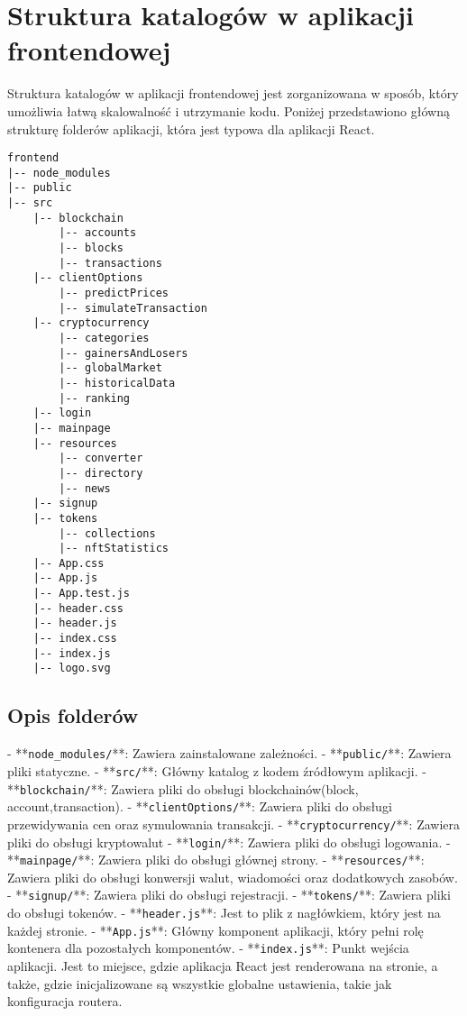 \section{Struktura katalogów w aplikacji frontendowej}

Struktura katalogów w aplikacji frontendowej jest zorganizowana w sposób, który umożliwia łatwą skalowalność i utrzymanie kodu. Poniżej przedstawiono główną strukturę folderów aplikacji, która jest typowa dla aplikacji React.
\begin{verbatim}
frontend
|-- node_modules
|-- public
|-- src
    |-- blockchain
        |-- accounts
        |-- blocks
        |-- transactions
    |-- clientOptions
        |-- predictPrices
        |-- simulateTransaction
    |-- cryptocurrency
        |-- categories
        |-- gainersAndLosers
        |-- globalMarket
        |-- historicalData
        |-- ranking
    |-- login
    |-- mainpage
    |-- resources
        |-- converter
        |-- directory
        |-- news
    |-- signup
    |-- tokens
        |-- collections
        |-- nftStatistics
    |-- App.css
    |-- App.js
    |-- App.test.js
    |-- header.css
    |-- header.js
    |-- index.css
    |-- index.js
    |-- logo.svg
\end{verbatim}


\subsection{Opis folderów}

- **\texttt{node\_modules/}**: Zawiera zainstalowane zależności.
- **\texttt{public/}**: Zawiera pliki statyczne.
- **\texttt{src/}**: Główny katalog z kodem źródłowym aplikacji.
  - **\texttt{blockchain/}**: Zawiera pliki do obsługi blockchainów(block, account,transaction). 
	- **\texttt{clientOptions/}**: Zawiera pliki do obsługi przewidywania cen oraz symulowania transakcji. 
	- **\texttt{cryptocurrency/}**: Zawiera pliki do obsługi kryptowalut 
	- **\texttt{login/}**: Zawiera pliki do obsługi logowania. 
	- **\texttt{mainpage/}**: Zawiera pliki do obsługi głównej strony. 
	- **\texttt{resources/}**: Zawiera pliki do obsługi konwersji walut, wiadomości oraz dodatkowych zasobów. 
	- **\texttt{signup/}**: Zawiera pliki do obsługi rejestracji. 
	- **\texttt{tokens/}**: Zawiera pliki do obsługi tokenów. 
	- **\texttt{header.js}**: Jest to plik z nagłówkiem, który jest na każdej stronie. 
  - **\texttt{App.js}**: Główny komponent aplikacji, który pełni rolę kontenera dla pozostałych komponentów. 
  - **\texttt{index.js}**: Punkt wejścia aplikacji. Jest to miejsce, gdzie aplikacja React jest renderowana na stronie, a także, gdzie inicjalizowane są wszystkie globalne ustawienia, takie jak konfiguracja routera.
